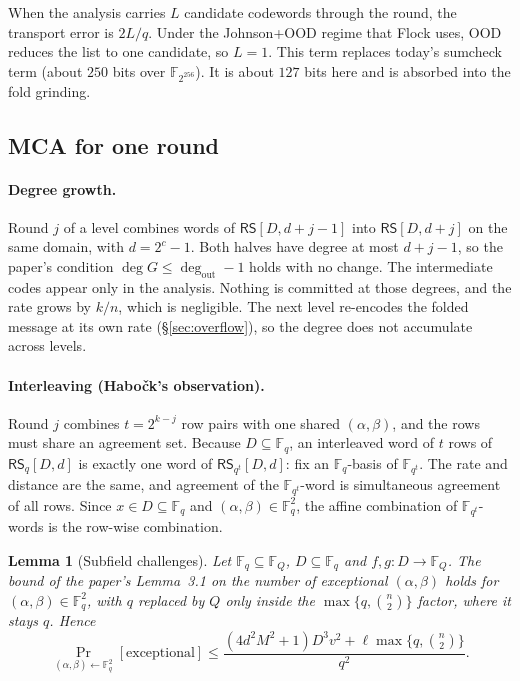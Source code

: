 \documentclass[11pt]{article}
\newcommand{\F}{\mathbb{F}}
\newcommand{\RS}{\mathsf{RS}}
\newtheorem{lemma}[theorem]{Lemma}
\begin{document}
When the analysis carries $L$ candidate codewords through the round,
the transport error is $2L/q$. Under the Johnson+OOD regime that Flock
uses, OOD reduces the list to one candidate, so $L = 1$. This term
replaces today's sumcheck term (about $250$ bits over
$\F_{2^{256}}$). It is about $127$ bits here and is absorbed into the
fold grinding.

\subsection{MCA for one round}\label{sec:mca}

\paragraph{Degree growth.} Round $j$ of a level combines words of
$\RS[D, d + j - 1]$ into $\RS[D, d + j]$ on the same domain, with
$d = 2^c - 1$. Both halves have degree at most $d + j - 1$, so the
paper's condition $\deg G \le \deg_{\mathrm{out}} - 1$ holds with no
change. The intermediate codes appear only in the analysis. Nothing is
committed at those degrees, and the rate grows by $k/n$, which is
negligible. The next level re-encodes the folded message at its own
rate (\S\ref{sec:overflow}), so the degree does not accumulate across
levels.

\paragraph{Interleaving (Habo\v{c}k's observation).} Round $j$
combines $t = 2^{k-j}$ row pairs with one shared $(\alpha, \beta)$,
and the rows must share an agreement set. Because $D \subseteq \F_q$,
an interleaved word of $t$ rows of $\RS_q[D, d]$ is exactly one word of
$\RS_{q^t}[D, d]$: fix an $\F_q$-basis of $\F_{q^t}$. The rate and
distance are the same, and agreement of the $\F_{q^t}$-word is
simultaneous agreement of all rows. Since $x \in D \subseteq \F_q$ and
$(\alpha, \beta) \in \F_q^2$, the affine combination of
$\F_{q^t}$-words is the row-wise combination.

\begin{lemma}[Subfield challenges]\label{lem:subfield}
Let $\F_q \subseteq \F_Q$, $D \subseteq \F_q$ and $f, g: D \to \F_Q$.
The bound of the paper's Lemma~3.1 on the number of exceptional
$(\alpha, \beta)$ holds for $(\alpha, \beta) \in \F_q^2$, with $q$
replaced by $Q$ only inside the $\max\{q, \binom n2\}$ factor, where it
stays $q$. Hence
\[
  \Pr_{(\alpha, \beta) \leftarrow \F_q^2}[\text{exceptional}] \le
  \frac{(4d^2M^2 + 1)D^3 v^2 + \ell \max\{q, \binom n2\}}{q^2}.
\]
\end{lemma}
\end{document}
